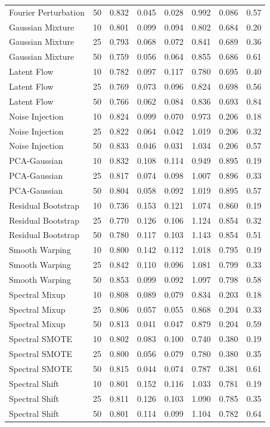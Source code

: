 \begin{table}[t]
\begin{tabular}{lrrrrrrr}
Fourier Perturbation & 50 & 0.832 & 0.045 & 0.028 & 0.992 & 0.086 & 0.57 \\
Gaussian Mixture & 10 & 0.801 & 0.099 & 0.094 & 0.802 & 0.684 & 0.20 \\
Gaussian Mixture & 25 & 0.793 & 0.068 & 0.072 & 0.841 & 0.689 & 0.36 \\
Gaussian Mixture & 50 & 0.759 & 0.056 & 0.064 & 0.855 & 0.686 & 0.61 \\
Latent Flow & 10 & 0.782 & 0.097 & 0.117 & 0.780 & 0.695 & 0.40 \\
Latent Flow & 25 & 0.769 & 0.073 & 0.096 & 0.824 & 0.698 & 0.56 \\
Latent Flow & 50 & 0.766 & 0.062 & 0.084 & 0.836 & 0.693 & 0.84 \\
Noise Injection & 10 & 0.824 & 0.099 & 0.070 & 0.973 & 0.206 & 0.18 \\
Noise Injection & 25 & 0.822 & 0.064 & 0.042 & 1.019 & 0.206 & 0.32 \\
Noise Injection & 50 & 0.833 & 0.046 & 0.031 & 1.034 & 0.206 & 0.57 \\
PCA-Gaussian & 10 & 0.832 & 0.108 & 0.114 & 0.949 & 0.895 & 0.19 \\
PCA-Gaussian & 25 & 0.817 & 0.074 & 0.098 & 1.007 & 0.896 & 0.33 \\
PCA-Gaussian & 50 & 0.804 & 0.058 & 0.092 & 1.019 & 0.895 & 0.57 \\
Residual Bootstrap & 10 & 0.736 & 0.153 & 0.121 & 1.074 & 0.860 & 0.19 \\
Residual Bootstrap & 25 & 0.770 & 0.126 & 0.106 & 1.124 & 0.854 & 0.32 \\
Residual Bootstrap & 50 & 0.780 & 0.117 & 0.103 & 1.143 & 0.854 & 0.51 \\
Smooth Warping & 10 & 0.800 & 0.142 & 0.112 & 1.018 & 0.795 & 0.19 \\
Smooth Warping & 25 & 0.842 & 0.110 & 0.096 & 1.081 & 0.799 & 0.33 \\
Smooth Warping & 50 & 0.853 & 0.099 & 0.092 & 1.097 & 0.798 & 0.58 \\
Spectral Mixup & 10 & 0.808 & 0.089 & 0.079 & 0.834 & 0.203 & 0.18 \\
Spectral Mixup & 25 & 0.806 & 0.057 & 0.055 & 0.868 & 0.204 & 0.33 \\
Spectral Mixup & 50 & 0.813 & 0.041 & 0.047 & 0.879 & 0.204 & 0.59 \\
Spectral SMOTE & 10 & 0.802 & 0.083 & 0.100 & 0.740 & 0.380 & 0.19 \\
Spectral SMOTE & 25 & 0.800 & 0.056 & 0.079 & 0.780 & 0.380 & 0.35 \\
Spectral SMOTE & 50 & 0.815 & 0.044 & 0.074 & 0.787 & 0.381 & 0.61 \\
Spectral Shift & 10 & 0.801 & 0.152 & 0.116 & 1.033 & 0.781 & 0.19 \\
Spectral Shift & 25 & 0.811 & 0.126 & 0.103 & 1.090 & 0.785 & 0.35 \\
Spectral Shift & 50 & 0.801 & 0.114 & 0.099 & 1.104 & 0.782 & 0.64 \\
\bottomrule
\end{tabular}
\end{table}
